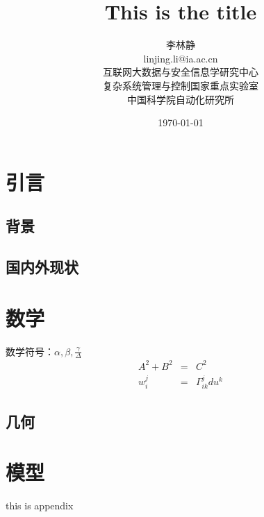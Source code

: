 \documentclass[a4paper,12pt]{article}
\begin{document}
\title{This is the title}
\author{
	李林静\\
	linjing.li@ia.ac.cn\\
	互联网大数据与安全信息学研究中心\\
	复杂系统管理与控制国家重点实验室\\
	中国科学院自动化研究所
	}
\date{\today}

\maketitle

\section{引言}

\subsection{背景}

\subsection{国内外现状}


\section{数学}

数学符号：$\alpha,\beta,\frac{\gamma}{\Delta}$
\begin{eqnarray}
	A^2 + B^2 &=& C^2 \\
	w_i^j &=& \Gamma_{ik}^jdu^k
\end{eqnarray}

\subsection{几何}

\section{模型}

this is appendix
\end{document}
